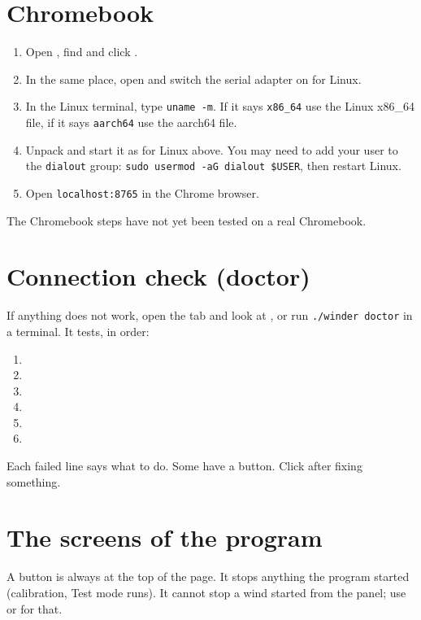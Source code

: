 \section{Chromebook}\label{sec:chromebook}
\begin{enumerate}
  \item Open , find  and click .
  \item In the same place, open  and switch the serial
        adapter on for Linux.
  \item In the Linux terminal, type \texttt{uname -m}. If it says
        \texttt{x86\_64} use the Linux x86\_64 file, if it says
        \texttt{aarch64} use the aarch64 file.
  \item Unpack and start it as for Linux above. You may need to add your user
        to the \texttt{dialout} group: \texttt{sudo usermod -aG dialout \$USER},
        then restart Linux.
  \item Open \texttt{localhost:8765} in the Chrome browser.
\end{enumerate}
\begin{note}
The Chromebook steps have not yet been tested on a real Chromebook.
\end{note}

\section{Connection check (doctor)}\label{sec:doctor}
If anything does not work, open the  tab and look at
, or run \texttt{./winder doctor} in a terminal. It tests,
in order:
\begin{enumerate}
  \item {}
  \item {}
  \item {}
  \item {}
  \item {}
  \item {}
\end{enumerate}
Each failed line says what to do. Some have a  button. Click
 after fixing something.

\section{The screens of the program}
A  button is always at the top of the page. It stops anything
the program started (calibration, Test mode runs). It cannot stop a wind
started from the panel; use  or  for that.


